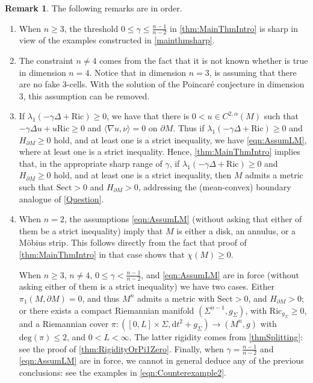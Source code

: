 \documentclass[12pt,a4paper,reqno]{amsart}
\theoremstyle{definition}
\newtheorem{remark}{Remark}
\renewcommand{\leq}{\leqslant}
\renewcommand{\geq}{\geqslant}
\begin{document}
\begin{remark}
The following remarks are in order.
\begin{enumerate}
    \item When $n\geq 3$, the threshold $0\leq \gamma\leq \frac{n-1}{n-2}$ in \cref{thm:MainThmIntro} is sharp in view of the examples constructed in \cref{mainthmsharp}. 
    
    \item The constraint $n\neq 4$ comes from the fact that it is not known whether \cite[Proposition 5.3]{LawsonMichelsohn} is true in dimension $n=4$. Notice that in dimension $n=3$, \cite[Theorem 1.1]{LawsonMichelsohn} is assuming that there are no fake $3$-cells. With the solution of the Poincaré conjecture in dimension $3$, this assumption can be removed.
    \item If $\lambda_1(-\gamma\Delta+\mathrm{Ric})\geq 0$, we have that there is $0<u\in C^{2,\alpha}(M)$ such that $-\gamma\Delta u + u\mathrm{Ric}\geq 0$ and $\langle \nabla u,\nu \rangle=0$ on $\partial M$. Thus if $\lambda_1(-\gamma\Delta+\mathrm{Ric})\geq 0$ and $H_{\partial M}\geq 0$ hold, and at least one is a strict inequality, we have \eqref{eqn:AssumLM}, where at least one is a strict inequality. Hence, \cref{thm:MainThmIntro} implies that, in the appropriate sharp range of $\gamma$, if $\lambda_1(-\gamma\Delta+\mathrm{Ric})\geq 0$ and $H_{\partial M}\geq 0$ hold, and at least one is a strict inequality, then $M$ admits a metric such that $\mathrm{Sect}>0$ and $H_{\partial M}>0$, addressing the (mean-convex) boundary analogue of \cref{Question}.
    \item When $n = 2$, the assumptions \eqref{eqn:AssumLM} (without asking that either of them be a strict inequality) imply that $M$ is either a disk, an annulus, or a M\"obius strip. This follows directly from the fact that proof of \cref{thm:MainThmIntro} in that case shows that $\chi(M)\geq 0$. 
    
    When $n\geq 3$, $n\neq 4$, $0\leq \gamma<\frac{n-1}{n-2}$, and \eqref{eqn:AssumLM} are in force (without asking either of them is a strict inequality) we have two cases. Either $\pi_1(M,\partial M)=0$, and thus $M^n$ admits a metric with $\mathrm{Sect}>0$, and $H_{\partial M}>0$; or there exists a compact Riemannian manifold $(\Sigma^{n-1},g_\Sigma)$, with $\mathrm{Ric}_{g_\Sigma}\geq 0$, and a Riemannian cover $\pi:([0,L]\times\Sigma,\mathrm{d}t^2+g_{\Sigma})\to (M^n,g)$ with $\mathrm{deg}(\pi)\leq 2$, and $0<L<\infty$. The latter rigidity comes from \cref{thmSplitting}: see the proof of \cref{thm:RigidityOrPi1Zero}. Finally, when $\gamma=\frac{n-1}{n-2}$ and \eqref{eqn:AssumLM} are in force, we cannot in general deduce any of the previous conclusions: see the examples in \cref{eqn:Counterexample2}.
    \end{enumerate}
    \end{remark}
    
\end{document}

